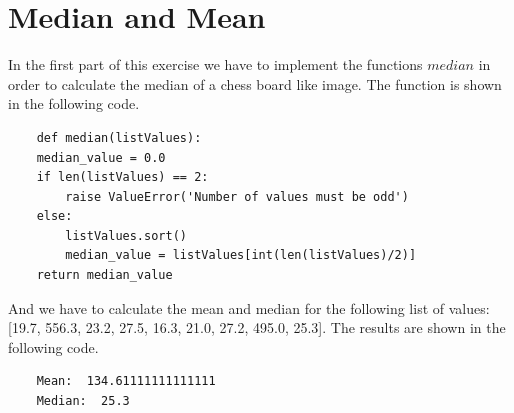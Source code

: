 \documentclass[12pt
,headinclude
,headsepline
,bibtotocnumbered
]{scrartcl}
\begin{document}
\section{Median and Mean}
In the first part of this exercise we have to implement the functions $median$ in order to calculate the median of a chess board like image. The function is shown in the following code.
\begin{lstlisting}
    def median(listValues):
    median_value = 0.0
    if len(listValues) == 2:
        raise ValueError('Number of values must be odd')
    else:
        listValues.sort()
        median_value = listValues[int(len(listValues)/2)]
    return median_value
\end{lstlisting}
And we have to calculate the mean and median for the following list of values: [19.7, 556.3, 23.2, 27.5, 16.3, 21.0, 27.2, 495.0, 25.3]. The results are shown in the following code.
\begin{verbatim}
    Mean:  134.61111111111111
    Median:  25.3
\end{verbatim}
\end{document}
